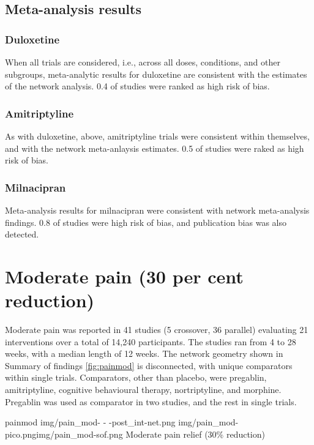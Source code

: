 \documentclass{report}\usepackage[]{graphicx}\usepackage[]{color}
\begin{document}
\subsection{Meta-analysis results}

\subsubsection{Duloxetine}

When all trials are considered, i.e., across all doses,  conditions, and other subgroups, meta-analytic results for duloxetine are consistent with the estimates of the network analysis. 0.4 of studies were ranked as high risk of bias.

\subsubsection{Amitriptyline}

As with duloxetine, above, amitriptyline trials were consistent within themselves, and with the network meta-anlaysis estimates. 0.5 of studies were raked as high risk of bias.

\subsubsection{Milnacipran}

Meta-analysis results for milnacipran were consistent with network meta-analysis findings. 0.8 of studies were high risk of bias, and publication bias was also detected.



\section{Moderate pain (30 per cent reduction)}

Moderate pain was reported in 41 studies (5 crossover, 36 parallel) evaluating 21 interventions over a total of 14,240 participants. The studies ran from 4 to 28 weeks, with a median length of 12 weeks. The network geometry shown in Summary of findings \ref{fig:painmod}  is disconnected, with unique comparators within single trials. Comparators, other than placebo, were pregablin, amitriptyline, cognitive behavioural therapy, nortriptyline, and morphine. Pregablin was used as comparator in two studies, and the rest in single trials.

\soffignew
{painmod}
{img/pain_mod- - -post_int-net.png}
{img/pain_mod-pico.png}{img/pain_mod-sof.png}
{Moderate pain relief (30\% reduction)}
\end{document}
